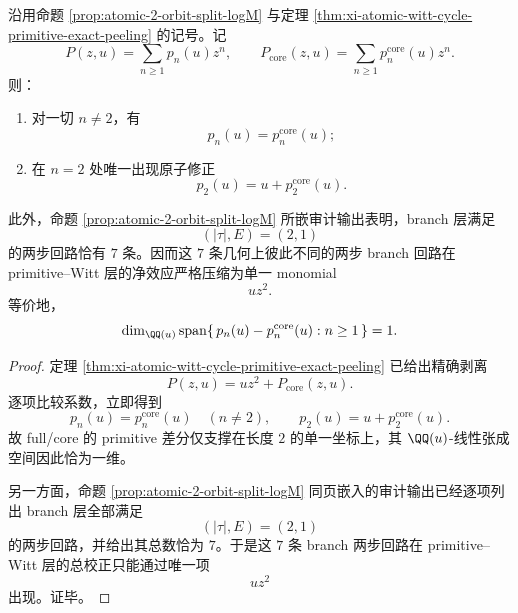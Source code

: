 \begin{theorem}\label{thm:xi-time-part62d-atomic-two-step-witt-rankone-collapse}
沿用命题 \ref{prop:atomic-2-orbit-split-logM} 与定理
\ref{thm:xi-atomic-witt-cycle-primitive-exact-peeling} 的记号。记
\[
P(z,u)=\sum_{n\ge 1}p_n(u)z^n,
\qquad
P_{\mathrm{core}}(z,u)=\sum_{n\ge 1}p_n^{\mathrm{core}}(u)z^n.
\]
则：
\begin{enumerate}
  \item 对一切 \(n\neq 2\)，有
  \[
  p_n(u)=p_n^{\mathrm{core}}(u);
  \]
  \item 在 \(n=2\) 处唯一出现原子修正
  \[
  p_2(u)=u+p_2^{\mathrm{core}}(u).
  \]
\end{enumerate}
此外，命题 \ref{prop:atomic-2-orbit-split-logM} 所嵌审计输出表明，branch 层满足
\[
(|\tau|,E)=(2,1)
\]
的两步回路恰有 \(7\) 条。因而这 \(7\) 条几何上彼此不同的两步 branch 回路在 primitive--Witt 层的净效应严格压缩为单一 monomial
\[
u z^2.
\]
等价地，
\[
\dim_{\QQ(u)}
\operatorname{span}\{\,p_n(u)-p_n^{\mathrm{core}}(u):n\ge 1\,\}=1.
\]
\end{theorem}
\begin{proof}
定理 \ref{thm:xi-atomic-witt-cycle-primitive-exact-peeling} 已给出精确剥离
\[
P(z,u)=u z^2+P_{\mathrm{core}}(z,u).
\]
逐项比较系数，立即得到
\[
p_n(u)=p_n^{\mathrm{core}}(u)\quad(n\neq 2),
\qquad
p_2(u)=u+p_2^{\mathrm{core}}(u).
\]
故 full/core 的 primitive 差分仅支撑在长度 \(2\) 的单一坐标上，其 \(\QQ(u)\)-线性张成空间因此恰为一维。

另一方面，命题 \ref{prop:atomic-2-orbit-split-logM} 同页嵌入的审计输出已经逐项列出 branch 层全部满足
\[
(|\tau|,E)=(2,1)
\]
的两步回路，并给出其总数恰为 \(7\)。于是这 \(7\) 条 branch 两步回路在 primitive--Witt 层的总校正只能通过唯一项
\[
u z^2
\]
出现。证毕。
\end{proof}

